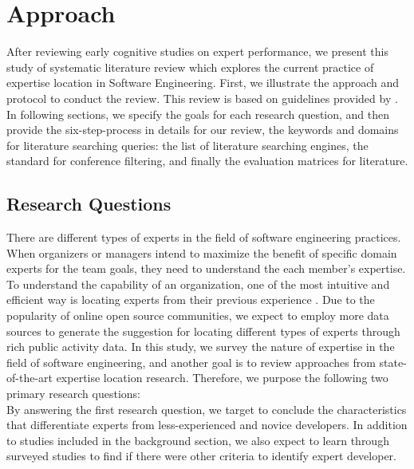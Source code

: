 \chapter{Approach}

After reviewing early cognitive studies on expert performance, we present this study of systematic literature review which explores the current practice of expertise location in Software Engineering. First, we illustrate the approach and protocol to conduct the review. This review is based on guidelines provided by \citeauthor{KITCHENHAM20132049} \cite{KITCHENHAM20132049}. In following sections, we specify the goals for each research question, and then provide the six-step-process in details for our review, the keywords and domains for literature searching queries: the list of literature searching engines, the standard for conference filtering, and finally the evaluation matrices for literature.

\section{Research Questions}

There are different types of experts in the field of software engineering practices. When organizers or managers intend to maximize the benefit of specific domain experts for the team goals, they need to understand the each member's expertise. To understand the capability of an organization, one of the most intuitive and efficient way is locating experts from their previous experience \cite{mcdonald2000expertise}. Due to the popularity of online open source communities, we expect to employ more data sources to generate the suggestion for locating different types of experts through rich public activity data. In this study, we survey the nature of expertise in the field of software engineering, and another goal is to review approaches from state-of-the-art expertise location research. Therefore, we purpose the following two primary research questions:\\

\hfill\break
By answering the first research question, we target to conclude the characteristics that differentiate experts from less-experienced and novice developers. In addition to studies included in the background section, we also expect to learn through surveyed studies to find if there were other criteria to identify expert developer.\\

